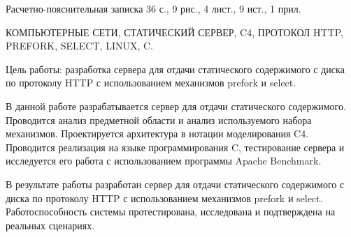 
Расчетно-пояснительная записка 36 с., 9 рис., 4 лист., 9 ист., 1 прил.

КОМПЬЮТЕРНЫЕ СЕТИ, СТАТИЧЕСКИЙ СЕРВЕР, C4, ПРОТОКОЛ HTTP, PREFORK, SELECT, LINUX, C.

Цель работы: разработка сервера для отдачи статического содержимого с диска по протоколу HTTP с использованием механизмов prefork и select.

В данной работе разрабатывается сервер для отдачи статического содержимого. Проводится анализ предметной области и анализ используемого набора механизмов. Проектируется архитектура в нотации моделирования C4. Проводится реализация на языке программирования C, тестирование сервера и исследуется его работа с использованием программы Apache Benchmark.

В результате работы разработан сервер для отдачи статического содержимого с диска по протоколу HTTP с использованием механизмов prefork и select.  Работоспособность системы протестирована, исследована и подтверждена на реальных сценариях.
